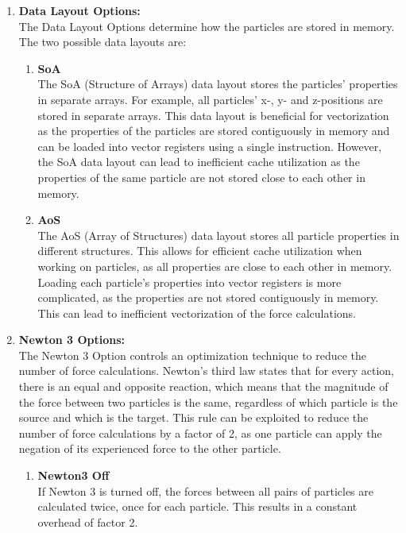 \begin{enumerate}[label=\textbf{\arabic*.}]
\begin{enumerate}
            \end{enumerate}


      \item \textbf{Data Layout Options:} \\
            The Data Layout Options determine how the particles are stored in memory. The two possible data layouts are:
            \begin{enumerate}
                  \item \textbf{SoA} \\
                        The SoA (Structure of Arrays) data layout stores the particles' properties in separate arrays. For example, all particles' x-, y- and z-positions are stored in separate arrays. This data layout is beneficial for vectorization as the properties of the particles are stored contiguously in memory and can be loaded into vector registers using a single instruction. However, the SoA data layout can lead to inefficient cache utilization as the properties of the same particle are not stored close to each other in memory.

                  \item \textbf{AoS} \\
                        The AoS (Array of Structures) data layout stores all particle properties in different structures. This allows for efficient cache utilization when working on particles, as all properties are close to each other in memory.
                        Loading each particle's properties into vector registers is more complicated, as the properties are not stored contiguously in memory. This can lead to inefficient vectorization of the force calculations.
            \end{enumerate}

      \item \textbf{Newton 3 Options:} \\
            The Newton 3 Option controls an optimization technique to reduce the number of force calculations. Newton's third law states that for every action, there is an equal and opposite reaction, which means that the magnitude of the force between two particles is the same, regardless of which particle is the source and which is the target. This rule can be exploited to reduce the number of force calculations by a factor of 2, as one particle can apply the negation of its experienced force to the other particle.
            \begin{enumerate}
                  \item \textbf{Newton3 Off} \\
                        If Newton 3 is turned off, the forces between all pairs of particles are calculated twice, once for each particle. This results in a constant overhead of factor 2.


\end{enumerate}
\end{enumerate}

